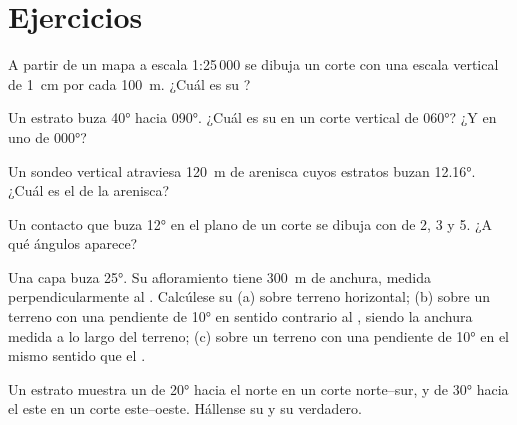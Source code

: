 \section{Ejercicios}

\begin{exercise}[$\star$]\label{exo:b1:cross-sections:1}
A partir de un mapa a escala 1:25\,000 se dibuja un corte con una escala vertical de \qty{1}{cm} por
cada \qty{100}{m}. ¿Cuál es su ?
\end{exercise}

\begin{exercise}[$\star$]\label{exo:b1:cross-sections:2}
Un estrato buza \ang{40} hacia \ang{090}. ¿Cuál es su  en un corte vertical de
 \ang{060}? ¿Y en uno de  \ang{000}?
\end{exercise}

\begin{exercise}[$\star$]\label{exo:b1:cross-sections:3}
Un sondeo vertical atraviesa \qty{120}{m} de arenisca cuyos estratos buzan \ang{12.16}. ¿Cuál es el
 de la arenisca?
\end{exercise}

\begin{exercise}[$\star$]\label{exo:b1:cross-sections:4}
Un contacto que buza \ang{12} en el plano de un corte se dibuja con  de 2, 3
y 5. ¿A qué ángulos aparece?
\end{exercise}

\begin{exercise}[$\star\star$]\label{exo:b1:cross-sections:5}
Una capa buza \ang{25}. Su afloramiento tiene \qty{300}{m} de anchura, medida perpendicularmente al
. Calcúlese su  (a) sobre terreno horizontal; (b) sobre un terreno con una
pendiente de \ang{10} en sentido contrario al , siendo la anchura medida a lo largo del
terreno; (c) sobre un terreno con una pendiente de \ang{10} en el mismo sentido que el .
\end{exercise}

\begin{exercise}[$\star\star$]\label{exo:b1:cross-sections:6}
Un estrato muestra un  de \ang{20} hacia el norte en un corte norte--sur, y de
\ang{30} hacia el este en un corte este--oeste. Hállense su  y su 
verdadero.
\end{exercise}

